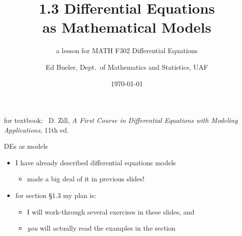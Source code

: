 \documentclass{beamer}
\title{1.3 Differential Equations \\ as Mathematical Models}
\subtitle{a lesson for MATH F302 Differential Equations}
\author{Ed Bueler, Dept.~of Mathematics and Statistics, UAF}
\date{\tiny \today}
\begin{document}


\begin{frame}
\titlepage

\centerline{\tiny for textbook: \, D. Zill, \emph{A First Course in Differential Equations with Modeling Applications}, 11th ed.}
\end{frame}


\begin{frame}{DEs as models}

\begin{itemize}
\item I have already described differential equations models
    \begin{itemize}
    \item made a big deal of it in previous slides!
    \end{itemize}
\item for section \S 1.3 my plan is:
    \begin{itemize}
    \item I will work-through several exercises in these slides, and
    \item \emph{you} will actually read the examples in the section
    \end{itemize}
\end{itemize}
\end{frame}
\end{document}
